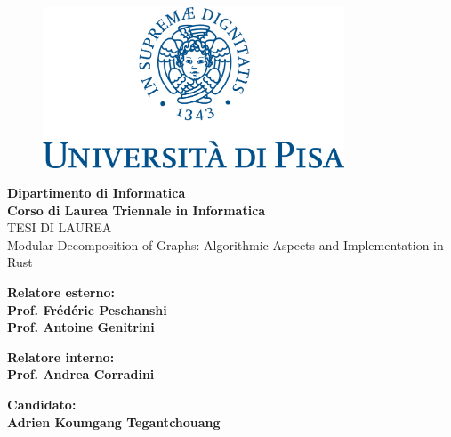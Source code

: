 \begin{titlepage} %
\begin{figure}[t] %
    \centering\includegraphics[width=0.80\textwidth]{marchio_unipi_pant541}\label{fig:figure-first-page}
\end{figure}

\vspace{20mm}

\begin{Large}
 \begin{center}
	\textbf{Dipartimento di Informatica\\ Corso di Laurea Triennale in Informatica\\}
	\vspace{2cm}
    {\LARGE{TESI DI LAUREA}}\\
	\vspace{2cm}
	{\Large{Modular Decomposition of Graphs: Algorithmic Aspects and Implementation in Rust}}
\end{center}
\end{Large}

\vspace{15mm}

\begin{minipage}[t]{0.47\textwidth}
	{\large{\textbf{Relatore esterno:\\ Prof. Frédéric Peschanshi \\ Prof. Antoine Genitrini}}}

	\vspace{0.5cm}

	{\large{\textbf{Relatore interno: \\ Prof. Andrea Corradini}}}
\end{minipage}
\hfill
\begin{minipage}[t]{0.47\textwidth}\raggedleft
	{\large{\textbf{Candidato: \\ Adrien Koumgang Tegantchouang}}}
\end{minipage}

\vspace{20mm}


\end{titlepage}
